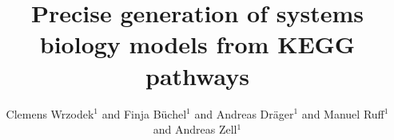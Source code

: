 \documentclass[10pt]{bmc_article}
\newenvironment{bmcformat}{\baselineskip20pt\sloppy\setboolean{publ}{false}}{\baselineskip20pt\sloppy}
\begin{document}
\begin{bmcformat}



\title{Precise generation of systems biology models from KEGG pathways}



\author{
Clemens Wrzodek\correspondingauthor$^1$
 and
Finja B\"uchel$^1$  and
Andreas Dr\"ager$^1$  and
Manuel Ruff$^1$  and
Andreas Zell$^1$ 
}



\address{%
    \iid(1)Center for Bioinformatics Tuebingen (ZBIT), University of Tuebingen, Sand 1, 72076 T\"ubingen, Germany
}%

\maketitle




\end{bmcformat}
\end{document}
